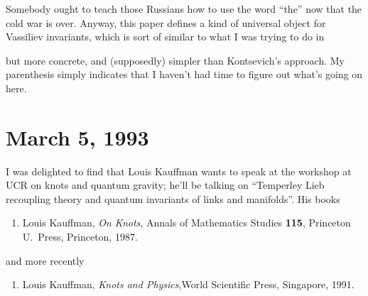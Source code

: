 \documentclass[12pt]{article}
\def\tightlist{}
\renewcommand{\texttt}[1]{%
  \begingroup
  \ttfamily
  \begingroup\lccode`~=`/\lowercase{\endgroup\def~}{/\discretionary{}{}{}}%
  \begingroup\lccode`~=`[\lowercase{\endgroup\def~}{[\discretionary{}{}{}}%
  \begingroup\lccode`~=`.\lowercase{\endgroup\def~}{.\discretionary{}{}{}}%
  \catcode`/=\active\catcode`[=\active\catcode`.=\active
  \scantokens{#1\noexpand}%
  \endgroup
}
\begin{document}

Somebody ought to teach those Russians how to use the word ``the'' now
that the cold war is over. Anyway, this paper defines a kind of
universal object for Vassiliev invariants, which is sort of similar to
what I was trying to do in

\noindent
but more concrete, and (supposedly) simpler than Kontsevich's approach.
My parenthesis simply indicates that I haven't had time to figure out
what's going on here.


\hypertarget{week8}{%
\section{March 5, 1993}\label{week8}}

I was delighted to find that Louis Kauffman wants to speak at the
workshop at UCR on knots and quantum gravity; he'll be talking on
``Temperley Lieb recoupling theory and quantum invariants of links and
manifolds''. His books

\begin{enumerate}
\def\labelenumi{\arabic{enumi})}
\item
   Louis Kauffman, 
   \emph{On Knots}, Annals of Mathematics Studies \textbf{115}, Princeton
   U.\ Press, Princeton, 1987.
\end{enumerate}

and more recently

\begin{enumerate}
\def\labelenumi{\arabic{enumi})}
\setcounter{enumi}{1}
\item
    Louis Kauffman, 
  \emph{Knots and Physics},World Scientific Press, Singapore, 1991.
\end{enumerate}
\end{document}
